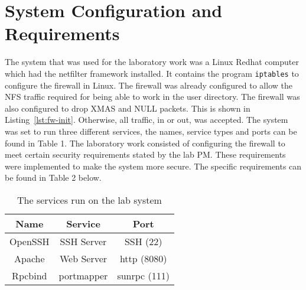 \section{System Configuration and Requirements}
\label{sec:setup}
The system that was used for the laboratory work was a Linux Redhat computer which had the netfilter framework installed. It contains the program \verb;iptables; to configure the firewall in Linux. The firewall was already configured to allow the NFS traffic required for being able to work in the user directory. The firewall was also configured to drop XMAS and NULL packets. This is shown in Listing~\ref{lst:fw-init}. Otherwise, all traffic, in or out, was accepted. The system was set to run three different services, the names, service types and ports can be found in Table 1. The laboratory work consisted of configuring the firewall to meet certain security requirements stated by the lab PM. These requirements were implemented to make the system more secure. The specific requirements can be found in Table 2 below.


\begin{table}[htp]
\centering
	\caption{The services run on the lab system}
	\begin{tabular}{| c | c | c |}
	\hline
	 Name & Service & Port \\ \hline
	 OpenSSH & SSH Server & SSH (22) \\
	 Apache & Web Server & http (8080) \\
	 Rpcbind & portmapper & sunrpc (111) \\ 
	\hline
	\end{tabular}
	\label{Service table}
\end{table}

